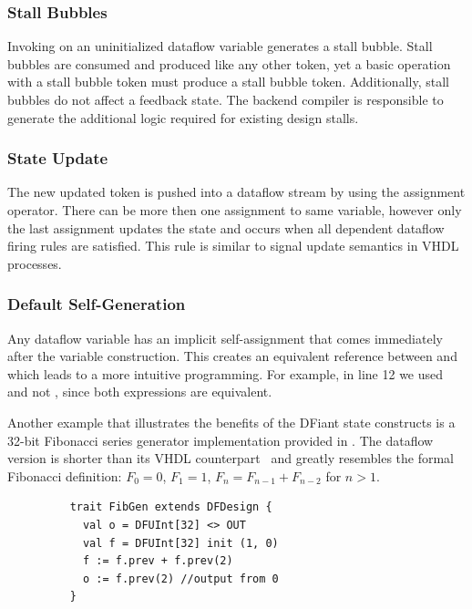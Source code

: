 \subsubsection{Stall Bubbles} 
\label{sec:stall_bubbles}
Invoking  on an uninitialized dataflow variable generates a stall bubble. Stall bubbles are consumed and produced like any other token, yet a basic operation with a stall bubble token must produce a stall bubble token. Additionally, stall bubbles do not affect a feedback state. The backend compiler is responsible to generate the additional logic required for existing design stalls. 

\subsubsection{State Update} 
\label{sec:state_update}
The new updated token is pushed into a dataflow stream by using the \code{:=} assignment operator. There can be more then one assignment to same variable, however only the last assignment updates the state and occurs when all dependent dataflow firing rules are satisfied. This rule is similar to signal update semantics in VHDL processes.

\subsubsection{Default Self-Generation} 
\label{sec:default_self_gen}
Any dataflow  variable has an implicit self-assignment  that comes immediately after the variable construction. This creates an equivalent reference between  and  which leads to a more intuitive programming.
For example, in line 12 we used  and not , since both expressions are equivalent.

\vspace{2ex}

Another example that illustrates the benefits of the DFiant state constructs is a 32-bit Fibonacci series generator implementation provided in . The dataflow version is shorter than its VHDL counterpart~\cite{fibgenvhdl} and greatly resembles the formal Fibonacci definition: $F_0 = 0$, $F_1 = 1$, $F_n = F_{n-1} + F_{n-2}$ for $n > 1$. 

\begin{figure}[h]
  \centering
  \captionsetup{justification=centering}    

  \begin{verbatim}
    trait FibGen extends DFDesign {
      val o = DFUInt[32] <> OUT
      val f = DFUInt[32] init (1, 0)
      f := f.prev + f.prev(2)
      o := f.prev(2) //output from 0
    }
  \end{verbatim}
  \label{fig:FibGen}
\end{figure}

